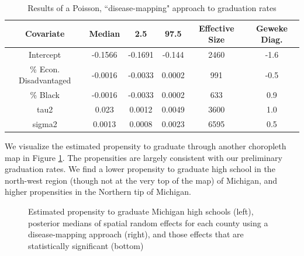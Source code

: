 \documentclass[12pt,letterpaper]{article}
\begin{document}
\begin{table}
  \caption{Results of a Poisson, ``disease-mapping" approach to graduation rates} 
  \label{tab:poi}
\centering
 \begin{tabular}{||c c c c c c||} 
 \hline
 Covariate & Median & 2.5 & 97.5 & Effective Size & Geweke Diag.\\ [0.5ex] 
 \hline\hline
 Intercept & -0.1566 & -0.1691 & -0.144 & 2460 & -1.6 \\ 
 \hline
 \% Econ. Disadvantaged & -0.0016 & -0.0033 & 0.0002 & 991 &-0.5 \\
 \hline
 \% Black & -0.0016 & -0.0033 & 0.0002 & 633 & 0.9\\
 \hline
 tau2 & 0.023 & 0.0012 & 0.0049 & 3600 & 1.0\\ 
\hline
 sigma2 & 0.0013 & 0.0008 & 0.0023 & 6595 & 0.5\\ [0.5ex] 
 \hline
\end{tabular}
\end{table}

We visualize the estimated propensity to graduate through another choropleth map in Figure \ref{lab:post_med_poi}. The propensities are largely consistent with our preliminary graduation rates. We find a lower propensity to graduate high school in the north-west region (though not at the very top of the map) of Michigan, and higher propensities in the Northern tip of Michigan. 

\begin{figure}[h!]
\caption{Estimated propensity to graduate Michigan high schools (left), posterior medians of spatial random effects for each county using a disease-mapping approach (right), and those effects that are statistically significant (bottom)}
\centering
\begin{minipage}{.5\textwidth}
  \centering
  \scalebox{.81}{
 \trimbox{1cm 2cm 0cm 0cm}{}
 }
\end{minipage}%
\begin{minipage}{.5\textwidth}
  \centering
  \scalebox{.81}{
 \trimbox{0cm 2cm -1cm 0cm}{}
 }
\end{minipage}

\begin{minipage}{.5\textwidth}
  \centering
  \scalebox{.81}{
 \trimbox{0cm 2cm -1cm 0cm}{}
 }
\end{minipage}
\label{lab:post_med_poi}
\end{figure}
\end{document}
